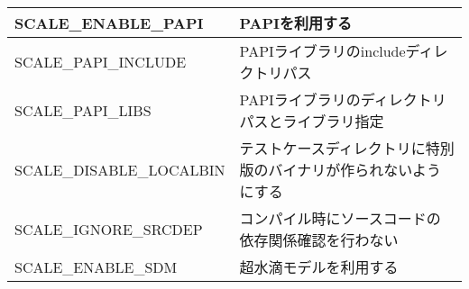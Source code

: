 \begin{table}[htb]
\begin{center}
\begin{tabularx}{150mm}{|l|X|}
 SCALE\_ENABLE\_PAPI      & PAPIを利用する  \\ \hline
 SCALE\_PAPI\_INCLUDE     & PAPIライブラリのincludeディレクトリパス  \\ \hline
 SCALE\_PAPI\_LIBS        & PAPIライブラリのディレクトリパスとライブラリ指定  \\ \hline
 SCALE\_DISABLE\_LOCALBIN & テストケースディレクトリに特別版のバイナリが作られないようにする  \\ \hline
 SCALE\_IGNORE\_SRCDEP    & コンパイル時にソースコードの依存関係確認を行わない  \\ \hline
 SCALE\_ENABLE\_SDM       & 超水滴モデルを利用する   \\ \hline
\end{tabularx}
\label{tab:env_var_list}
\end{center}
\end{table}

